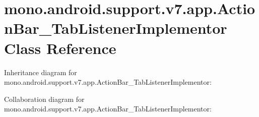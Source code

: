 \hypertarget{classmono_1_1android_1_1support_1_1v7_1_1app_1_1_action_bar___tab_listener_implementor}{}\section{mono.\+android.\+support.\+v7.\+app.\+Action\+Bar\+\_\+\+Tab\+Listener\+Implementor Class Reference}
\label{classmono_1_1android_1_1support_1_1v7_1_1app_1_1_action_bar___tab_listener_implementor}


Inheritance diagram for mono.\+android.\+support.\+v7.\+app.\+Action\+Bar\+\_\+\+Tab\+Listener\+Implementor\+:


Collaboration diagram for mono.\+android.\+support.\+v7.\+app.\+Action\+Bar\+\_\+\+Tab\+Listener\+Implementor\+:
